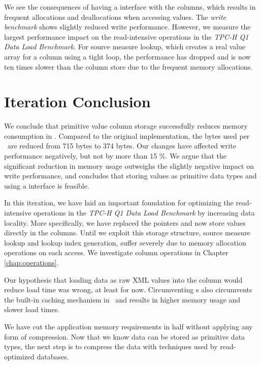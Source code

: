 We see the consequences of having a  interface with the columns, which results in frequent allocations and deallocations when accessing values. The \textit{write benchmark} shows slightly reduced write performance. However, we measure the largest performance impact on the read-intensive operations in the \textit{TPC-H Q1 Data Load Benchmark}. For source measure lookup, which creates a real value array for a column using a tight loop, the performance has dropped and is now ten times slower than the  column store due to the frequent memory allocations.


\section{Iteration Conclusion}
\label{sec:Iteration Conclusion}
We conclude that primitive value column storage successfully reduces memory consumption in \gap. Compared to the original implementation, the bytes used per \lineitem~are reduced from 715 bytes to 374 bytes. Our changes have affected write performance negatively, but not by more than 15 \%. We argue that the significant reduction in memory usage outweighs the slightly negative impact on write performance, and concludes that storing values as primitive data types and using a  interface is feasible. 

In this iteration, we have laid an important foundation for optimizing the read-intensive operations in the \textit{TPC-H Q1 Data Load Benchmark} by increasing data locality. More specifically, we have replaced the  pointers and now store values directly in the columns. Until we exploit this storage structure, source measure lookup and lookup index generation, suffer severely due to memory allocation operations on each access. We investigate column operations in Chapter \ref{chap:operations}.

Our hypothesis that loading data as raw XML values into the column would reduce load time was wrong, at least for now. Circumventing s also circumvents the built-in caching mechanism in \gap~and results in higher memory usage and slower load times.  

We have cut the application memory requirements in half without applying any form of compression. Now that we know data can be stored as primitive data types, the next step is to compress the data with techniques used by read-optimized databases.

